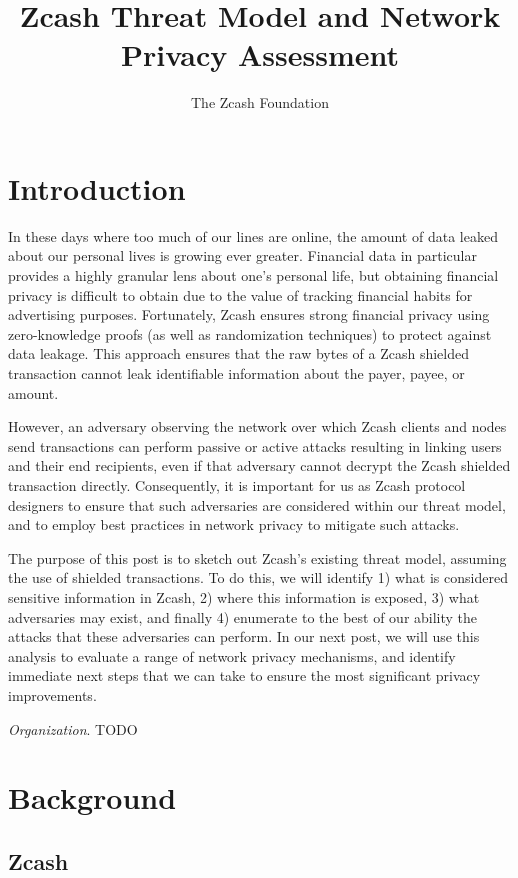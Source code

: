 \documentclass{article}
\title{Zcash Threat Model and Network Privacy Assessment}
\author{The Zcash Foundation}
\begin{document}
    \maketitle
\section{Introduction}

In these days where too much of our lines are online, the amount of data leaked
about our personal lives is growing ever greater. Financial data in particular
provides a highly granular lens about one’s personal life, but obtaining
financial privacy is difficult to obtain due to the value of tracking financial
habits for advertising purposes. Fortunately, Zcash ensures strong financial
privacy using zero-knowledge proofs (as well as randomization techniques) to
protect against data leakage. This approach ensures that the raw bytes of a
Zcash shielded transaction cannot leak identifiable information about the
payer, payee, or amount.

However, an adversary observing the network over which Zcash clients and nodes
send transactions  can perform passive or active attacks resulting in linking
users and their end recipients, even if that adversary cannot decrypt the Zcash
shielded transaction directly. Consequently, it is important for us as Zcash
protocol designers to ensure that such adversaries are considered within our
threat model, and to employ best practices in network privacy to mitigate such
attacks.

The purpose of this post is to sketch out Zcash’s existing threat model,
assuming the use of shielded transactions. To do this, we will identify 1) what
is considered sensitive information in Zcash, 2) where this information is
exposed, 3) what adversaries may exist, and finally 4) enumerate to the best of
our ability the attacks that these adversaries can perform. In our next post,
we will use this analysis to evaluate a range of network privacy mechanisms,
and identify immediate next steps that we can take to ensure the most
significant privacy improvements.

\textit{Organization}.
TODO

\section{Background}

\subsection{Zcash}
\end{document}
